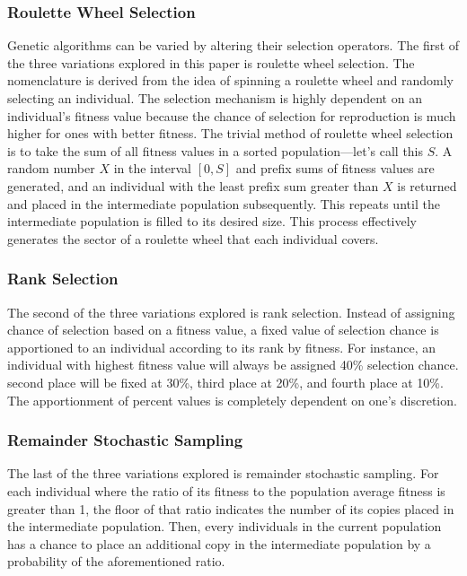 \documentclass[]{interact}
\theoremstyle{plain} %
\theoremstyle{definition}
\theoremstyle{remark}
\begin{document}
\subsubsection{Roulette Wheel Selection}
Genetic algorithms can be varied by altering their selection operators. The first of the three variations explored in this paper is roulette wheel selection. The nomenclature is derived from the idea of spinning a roulette wheel and randomly selecting an individual. The selection mechanism is highly dependent on an individual's fitness value because the chance of selection for reproduction is much higher for ones with better fitness. The trivial method of roulette wheel selection is to take the sum of all fitness values in a sorted population---let's call this $S$. A random number $X$ in the interval $[0, S]$ and prefix sums of fitness values are generated, and an individual with the least prefix sum greater than $X$ is returned and placed in the intermediate population subsequently. \cite{Obi98} This repeats until the intermediate population is filled to its desired size. This process effectively generates the sector of a roulette wheel that each individual covers.

\subsubsection{Rank Selection}
The second of the three variations explored is rank selection. Instead of assigning chance of selection based on a fitness value, a fixed value of selection chance is apportioned to an individual according to its rank by fitness. For instance, an individual with highest fitness value will always be assigned 40\% selection chance. second place will be fixed at 30\%, third place at 20\%, and fourth place at 10\%. The apportionment of percent values is completely dependent on one's discretion.

\subsubsection{Remainder Stochastic Sampling}
The last of the three variations explored is remainder stochastic sampling. For each individual where the ratio of its fitness to the population average fitness is greater than 1, the floor of that ratio indicates the number of its copies placed in the intermediate population. Then, every individuals in the current population has a chance to place an additional copy in the intermediate population by a probability of the aforementioned ratio. \cite{Bus01}
\end{document}
